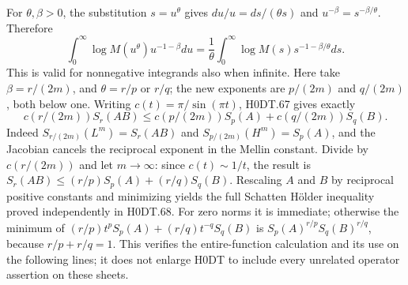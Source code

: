 For $\theta,\beta>0$, the substitution $s=u^\theta$ gives $du/u=ds/(\theta s)$ and $u^{-\beta}=s^{-\beta/\theta}$. Therefore
\[
 \int_0^\infty\log M(u^\theta)u^{-1-\beta}du
 =\frac1\theta\int_0^\infty\log M(s)s^{-1-\beta/\theta}ds.
\]
This is valid for nonnegative integrands also when infinite. Here take $\beta=r/(2m)$, and $\theta=r/p$ or $r/q$; the new exponents are $p/(2m)$ and $q/(2m)$, both below one. Writing $c(t)=\pi/\sin(\pi t)$, H0DT.67 gives exactly
\[
 c(r/(2m))S_r(AB)
 \le c(p/(2m))S_p(A)+c(q/(2m))S_q(B).
\]
Indeed $S_{r/(2m)}(L^m)=S_r(AB)$ and $S_{p/(2m)}(H^m)=S_p(A)$, and the Jacobian cancels the reciprocal exponent in the Mellin constant. Divide by $c(r/(2m))$ and let $m\to\infty$: since $c(t)\sim1/t$, the result is $S_r(AB)\le(r/p)S_p(A)+(r/q)S_q(B)$. Rescaling $A$ and $B$ by reciprocal positive constants and minimizing yields the full Schatten Hölder inequality proved independently in H0DT.68. For zero norms it is immediate; otherwise the minimum of $(r/p)t^p S_p(A)+(r/q)t^{-q}S_q(B)$ is $S_p(A)^{r/p}S_q(B)^{r/q}$, because $r/p+r/q=1$. This verifies the entire-function calculation and its use on the following lines; it does not enlarge H0DT to include every unrelated operator assertion on these sheets.
